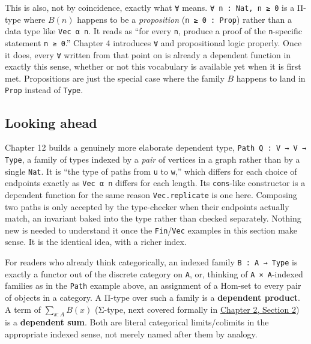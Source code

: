This is also, not by coincidence, exactly what \texttt{∀} means. \texttt{∀ n : Nat, n ≥ 0} is a Π-type where \(B(n)\) happens to be a \emph{proposition} (\texttt{n ≥ 0 : Prop}) rather than a data type like \texttt{Vec α n}. It reads as ``for every \texttt{n}, produce a proof of the \texttt{n}-specific statement \texttt{n ≥ 0}.'' Chapter 4 introduces \texttt{∀} and propositional logic properly. Once it does, every \texttt{∀} written from that point on is already a dependent function in exactly this sense, whether or not this vocabulary is available yet when it is first met. Propositions are just the special case where the family \(B\) happens to land in \texttt{Prop} instead of \texttt{Type}.

\subsection{Looking ahead}\label{sec:01-basics:03-dependent-types:8}

Chapter 12 builds a genuinely more elaborate dependent type, \texttt{Path Q : V → V → Type}, a family of types indexed by a \emph{pair} of vertices in a graph rather than by a single \texttt{Nat}. It is ``the type of paths from \texttt{u} to \texttt{w},'' which differs for each choice of endpoints exactly as \texttt{Vec α n} differs for each length. Its \texttt{cons}-like constructor is a dependent function for the same reason \texttt{Vec.replicate} is one here. Composing two paths is only accepted by the type-checker when their endpoints actually match, an invariant baked into the type rather than checked separately. Nothing new is needed to understand it once the \texttt{Fin}/\texttt{Vec} examples in this section make sense. It is the identical idea, with a richer index.

\begin{quote}
\end{quote}

\begin{mathreading}

For readers who already think categorically, an indexed family \texttt{B : A → Type} is exactly a functor out of the discrete category on \texttt{A}, or, thinking of \texttt{A × A}-indexed families as in the \texttt{Path} example above, an assignment of a \(\mathrm{Hom}\)-set to every pair of objects in a category. A Π-type over such a family is a \textbf{dependent product}. A term of \(\sum_{x:A} B(x)\) (Σ-type, next covered formally in \hyperref[sec:02-terminology-and-coc:02-pi-sigma-and-coc:1]{Chapter 2, Section 2}) is a \textbf{dependent sum}. Both are literal categorical limits/colimits in the appropriate indexed sense, not merely named after them by analogy.

\end{mathreading}

